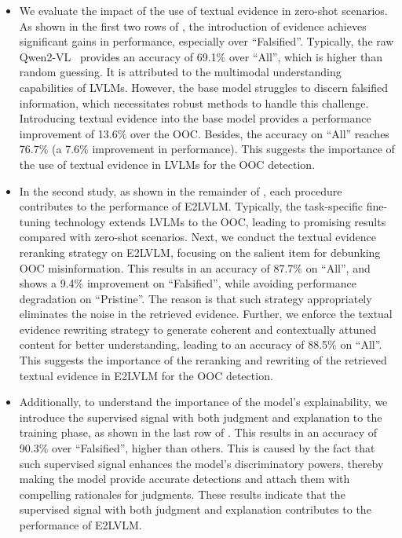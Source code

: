 \begin{itemize}
    \item We evaluate the impact of the use of textual evidence in zero-shot scenarios. As shown in the first two rows of , the introduction of evidence achieves significant gains in performance, especially over ``Falsified''. Typically, the raw Qwen2-VL~\cite{wang2024qwen2} provides an accuracy of 69.1$\%$ over ``All'', which is higher than random guessing. It is attributed to the multimodal understanding capabilities of LVLMs. However, the base model struggles to discern falsified information, which necessitates robust methods to handle this challenge. Introducing textual evidence into the base model provides a performance improvement of 13.6$\%$ over the OOC. Besides, the accuracy on ``All'' reaches 76.7$\%$ (a 7.6$\%$ improvement in performance). This suggests the importance of the use of textual evidence in LVLMs for the OOC detection.
    \item In the second study, as shown in the remainder of , each procedure contributes to the performance of E2LVLM. Typically, the task-specific fine-tuning technology extends LVLMs to the OOC, leading to promising results compared with zero-shot scenarios. Next, we conduct the textual evidence reranking strategy on E2LVLM, focusing on the salient item for debunking OOC misinformation. This results in an accuracy of 87.7$\%$ on ``All'', and shows a 9.4$\%$ improvement on ``Falsified'', while avoiding performance degradation on ``Pristine''. The reason is that such strategy appropriately eliminates the noise in the retrieved evidence. Further, we enforce the textual evidence rewriting strategy to generate coherent and contextually attuned content for better understanding, leading to an accuracy of 88.5$\%$ on ``All''. This suggests the importance of the reranking and rewriting of the retrieved textual evidence in E2LVLM for the OOC detection.
    \item Additionally, to understand the importance of the model’s explainability, we introduce the supervised signal with both judgment and explanation to the training phase, as shown in the last row of . This results in an accuracy of 90.3$\%$ over ``Falsified'', higher than others. This is caused by the fact that such supervised signal enhances the model's discriminatory powers, thereby making the model provide accurate detections and attach them with compelling rationales for judgments. These results indicate that the supervised signal with both judgment and explanation contributes to the performance of E2LVLM.
\end{itemize}





